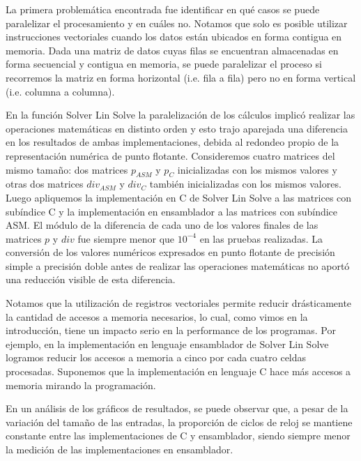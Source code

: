 
\par La primera problemática encontrada fue identificar en qué casos se puede paralelizar el procesamiento y en cuáles no. Notamos que solo es posible utilizar instrucciones vectoriales cuando los datos están ubicados en forma contigua en memoria. Dada una matriz de datos cuyas filas se encuentran almacenadas en forma secuencial y contigua en memoria, se puede paralelizar el proceso si recorremos la matriz en forma horizontal (i.e. fila a fila) pero no en forma vertical (i.e. columna a columna).\newline
\par En la función Solver Lin Solve la paralelización de los cálculos implicó realizar las operaciones matemáticas en distinto orden y esto trajo aparejada una diferencia en los resultados de ambas implementaciones, debida al redondeo propio de la representación numérica de punto flotante. Consideremos cuatro matrices del mismo tamaño: dos matrices $p_{ASM}$ y $p_C$ inicializadas con los mismos valores y otras dos matrices $div_{ASM}$ y $div_C$ también inicializadas con los mismos valores. Luego apliquemos la implementación en C de Solver Lin Solve a las matrices con subíndice C y la implementación en ensamblador a las matrices con subíndice ASM. El módulo de la diferencia de cada uno de los valores finales de las matrices $p$ y $div$ fue siempre menor que $10^{-4}$ en las pruebas realizadas. La conversión de los valores numéricos expresados en punto flotante de precisión simple a precisión doble antes de realizar las operaciones matemáticas no aportó una reducción visible de esta diferencia.\newline
\par Notamos que la utilización de registros vectoriales permite reducir drásticamente la cantidad de accesos a memoria necesarios, lo cual, como vimos en la introducción, tiene un impacto serio en la performance de los programas. Por ejemplo, en la implementación en lenguaje ensamblador de Solver Lin Solve logramos reducir los accesos a memoria a cinco por cada cuatro celdas procesadas. Suponemos que la implementación en lenguaje C hace más accesos a memoria mirando la programación.\newline
\par En un análisis de los gráficos de resultados, se puede observar que, a pesar de la variación del tamaño de las entradas, la proporción de ciclos de reloj se mantiene constante entre las implementaciones de C y ensamblador, siendo siempre menor la medición de las implementaciones en ensamblador.\newline
